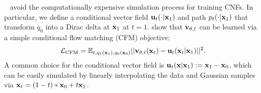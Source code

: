 ~\cite{lipman2022flow} avoid the computationally expensive simulation process for training CNFs.
%
%
In particular, we define a conditional vector field ${\mathbf{u}}_t(\cdot|{\mathbf{x}}_1)$ and path $p_t(\cdot|{\mathbf{x}}_1)$ that transform $q_0$ into a Dirac delta at ${\mathbf{x}}_1$ at $t=1$.
\citet{lipman2022flow} show that ${\mathbf{v}}_{\theta,t}$ can be learned via a simple conditional flow matching (CFM) objective:
\begin{equation}
\label{eq:cfm_x0_x1}
\mathcal{L}_{\text{CFM}} = \mathbb{E}_{t,q_1({\mathbf{x}}_1),q_0({\mathbf{x}}_0)}||{\mathbf{v}}_{\theta,t}({\mathbf{x}}_t) - {\mathbf{u}}_t({\mathbf{x}}_t|{\mathbf{x}}_1)||^2.
\end{equation}
A common choice for the conditional vector field is ${\mathbf{u}}_t({\mathbf{x}}|{\mathbf{x}}_1) := {\mathbf{x}}_1 - {\mathbf{x}}_0$, which can be easily simulated by linearly interpolating the data and Gaussian samples via ${\mathbf{x}}_t = (1 -t) * {\mathbf{x}}_0 + t {\mathbf{x}}_1$.

